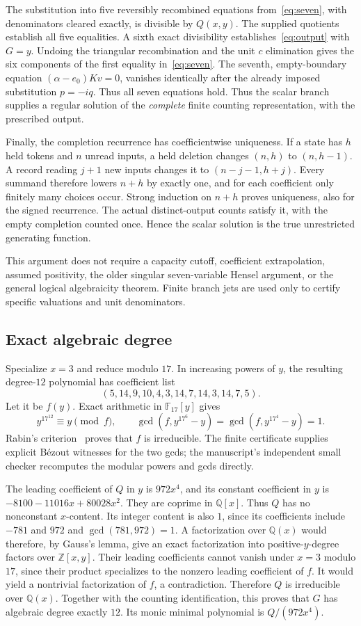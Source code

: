 \documentclass[11pt]{article}
\theoremstyle{definition}\newtheorem{definition}[theorem]{Definition}
\theoremstyle{remark}\newtheorem{remark}[theorem]{Remark}
\newcommand{\Q}{\mathbb Q}
\begin{document}
The substitution into five reversibly recombined equations from~\eqref{eq:seven}, with denominators cleared exactly, is divisible by $Q(x,y)$. The supplied quotients establish all five equalities. A sixth exact divisibility establishes~\eqref{eq:output} with $G=y$. Undoing the triangular recombination and the unit $c$ elimination gives the six components of the first equality in~\eqref{eq:seven}. The seventh, empty-boundary equation $(\alpha-e_0)Kv=0$, vanishes identically after the already imposed substitution $p=-iq$. Thus all seven equations hold. Thus the scalar branch supplies a regular solution of the \emph{complete} finite counting representation, with the prescribed output.

Finally, the completion recurrence has coefficientwise uniqueness. If a state has $h$ held tokens and $n$ unread inputs, a held deletion changes $(n,h)$ to $(n,h-1)$. A record reading $j+1$ new inputs changes it to $(n-j-1,h+j)$. Every summand therefore lowers $n+h$ by exactly one, and for each coefficient only finitely many choices occur. Strong induction on $n+h$ proves uniqueness, also for the signed recurrence. The actual distinct-output counts satisfy it, with the empty completion counted once. Hence the scalar solution is the true unrestricted generating function.

This argument does not require a capacity cutoff, coefficient extrapolation, assumed positivity, the older singular seven-variable Hensel argument, or the general logical algebraicity theorem. Finite branch jets are used only to certify specific valuations and unit denominators.

\subsection{Exact algebraic degree}
Specialize $x=3$ and reduce modulo $17$. In increasing powers of $y$, the resulting degree-$12$ polynomial has coefficient list
\[
 (5,14,9,10,4,3,14,7,14,3,14,7,5).
\]
Let it be $f(y)$. Exact arithmetic in $\mathbb F_{17}[y]$ gives
\[
 y^{17^{12}}\equiv y\pmod f,
 \qquad\gcd(f,y^{17^6}-y)=\gcd(f,y^{17^4}-y)=1.
\]
Rabin's criterion~\cite{Rabin1980} proves that $f$ is irreducible. The finite certificate supplies explicit B\'ezout witnesses for the two gcds; the manuscript's independent small checker recomputes the modular powers and gcds directly.

The leading coefficient of $Q$ in $y$ is $972x^4$, and its constant coefficient in $y$ is $-8100-11016x+80028x^2$. They are coprime in $\Q[x]$. Thus $Q$ has no nonconstant $x$-content. Its integer content is also $1$, since its coefficients include $-781$ and $972$ and $\gcd(781,972)=1$. A factorization over $\Q(x)$ would therefore, by Gauss's lemma, give an exact factorization into positive-$y$-degree factors over $\mathbb Z[x,y]$. Their leading coefficients cannot vanish under $x=3$ modulo $17$, since their product specializes to the nonzero leading coefficient of $f$. It would yield a nontrivial factorization of $f$, a contradiction. Therefore $Q$ is irreducible over $\Q(x)$. Together with the counting identification, this proves that $G$ has algebraic degree exactly $12$. Its monic minimal polynomial is $Q/(972x^4)$.
\end{document}
